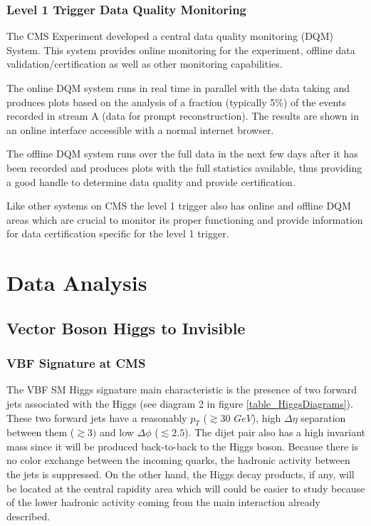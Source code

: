\documentclass[%
reprint,
amsmath,
amssymb,
aps,
pra,
showkeys
]{revtex4-1}
\begin{document}
\subsubsection{Level 1 Trigger Data Quality Monitoring}

The CMS Experiment developed a central data quality monitoring (DQM) System. This system provides online monitoring 
for the experiment, offline data validation/certification as well as other monitoring capabilities.

The online DQM system runs in real time in parallel with the data taking and produces plots based on the analysis of a
fraction (typically 5\%) of the events recorded in stream A (data for prompt reconstruction). The results are shown in 
an online interface accessible with a normal internet browser.

The offline DQM system runs over the full data in the next few days after it has been recorded and produces plots with 
the full statistics available, thus providing a good handle to determine data quality and provide certification.

Like other systems on CMS the level 1 trigger also has online and offline DQM areas which are crucial to monitor its 
proper functioning and provide information for data certification specific for the level 1 trigger.

\section{Data Analysis}

\subsection{Vector Boson Higgs to Invisible}

\subsubsection{VBF Signature at CMS}

The VBF SM Higgs signature main characteristic is the presence of two forward jets associated with the Higgs 
(see diagram 2 in figure \ref{table_HiggsDiagrams}). These two forward jets have a reasonably $p_T$ ($\gtrsim30$ $GeV$), 
high $\Delta\eta$ separation between them ($\gtrsim 3)$ and low $\Delta\phi$ ($\lesssim 2.5$).
The dijet pair also has a high invariant mass since it will be produced back-to-back to the Higgs boson. Because there
is no color exchange between the incoming quarks, the hadronic activity between the jets is suppressed. On the other
hand, the Higgs decay products, if any, will be located at the central rapidity area which will could be easier to 
study because of the lower hadronic activity coming from the main interaction already 
described\cite{article:Dokshitzer:1991he}. 
\end{document}
